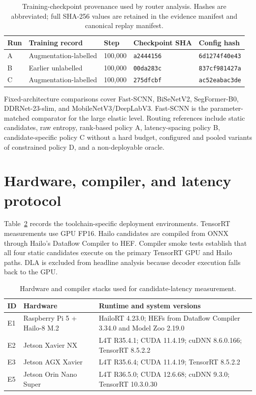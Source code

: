\documentclass[a4paper,review,12pt]{elsarticle}
\begin{document}
\begin{table}[H]
\centering
\caption{Training-checkpoint provenance used by router analysis. Hashes are abbreviated; full SHA-256 values are retained in the evidence manifest and canonical replay manifest.}
\label{tab:provenance}
\small
\begin{tabularx}{\textwidth}{@{}lXlll@{}}
\toprule
Run & Training record & Step & Checkpoint SHA & Config hash \\
\midrule
A & Augmentation-labelled & 100,000 & \texttt{a2444156} & \texttt{6d1274f40e43} \\
B & Earlier unlabelled & 100,000 & \texttt{00da283c} & \texttt{837cf981427a} \\
C & Augmentation-labelled & 100,000 & \texttt{275dfcbf} & \texttt{ac52eabac3de} \\
\bottomrule
\end{tabularx}
\end{table}

Fixed-architecture comparisons cover Fast-SCNN, BiSeNetV2, SegFormer-B0, DDRNet-23-slim, and MobileNetV3/\allowbreak DeepLabV3. Fast-SCNN is the parameter-matched comparator for the large elastic level. Routing references include static candidates, raw entropy, rank-based policy A, latency-spacing policy B, candidate-specific policy C without a hard budget, configured and pooled variants of constrained policy D, and a non-deployable oracle.

\section{Hardware, compiler, and latency protocol}

Table~\ref{tab:hardware} records the toolchain-specific deployment environments. TensorRT measurements use GPU FP16. Hailo candidates are compiled from ONNX through Hailo's Dataflow Compiler to HEF. Compiler smoke tests establish that all four static candidates execute on the primary TensorRT GPU and Hailo paths. DLA is excluded from headline analysis because decoder execution falls back to the GPU.

\begin{table}[H]
\centering
\caption{Hardware and compiler stacks used for candidate-latency measurement.}
\label{tab:hardware}
\small
\begin{tabularx}{\textwidth}{@{}ll>{\raggedright\arraybackslash}X@{}}
\toprule
ID & Hardware & Runtime and system versions \\
\midrule
E1 & Raspberry Pi 5 + Hailo-8 M.2 & HailoRT 4.23.0; HEFs from Dataflow Compiler 3.34.0 and Model Zoo 2.19.0 \\
E2 & Jetson Xavier NX & L4T R35.4.1; CUDA 11.4.19; cuDNN 8.6.0.166; TensorRT 8.5.2.2 \\
E3 & Jetson AGX Xavier & L4T R35.6.4; CUDA 11.4.19; TensorRT 8.5.2.2 \\
E5 & Jetson Orin Nano Super & L4T R36.5.0; CUDA 12.6.68; cuDNN 9.3.0; TensorRT 10.3.0.30 \\
\bottomrule
\end{tabularx}
\end{table}
\end{document}
